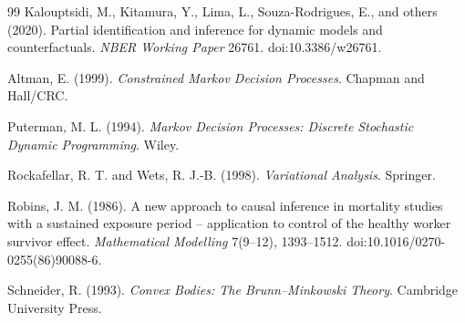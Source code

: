 \documentclass[11pt]{article}
\theoremstyle{definition}
\theoremstyle{plain}
\theoremstyle{remark}
\begin{document}
\begin{thebibliography}{99}
Kalouptsidi, M., Kitamura, Y., Lima, L., Souza-Rodrigues, E., and others (2020).
\newblock Partial identification and inference for dynamic models and counterfactuals.
\newblock \emph{NBER Working Paper} 26761.
\newblock doi:10.3386/w26761.

Altman, E. (1999).
\newblock \emph{Constrained Markov Decision Processes}.
\newblock Chapman and Hall/CRC.

Puterman, M. L. (1994).
\newblock \emph{Markov Decision Processes: Discrete Stochastic Dynamic Programming}.
\newblock Wiley.

Rockafellar, R. T. and Wets, R. J.-B. (1998).
\newblock \emph{Variational Analysis}.
\newblock Springer.

Robins, J. M. (1986).
\newblock A new approach to causal inference in mortality studies with a sustained exposure period -- application to control of the healthy worker survivor effect.
\newblock \emph{Mathematical Modelling} 7(9--12), 1393--1512.
\newblock doi:10.1016/0270-0255(86)90088-6.

Schneider, R. (1993).
\newblock \emph{Convex Bodies: The Brunn--Minkowski Theory}.
\newblock Cambridge University Press.
\end{thebibliography}
\end{document}
